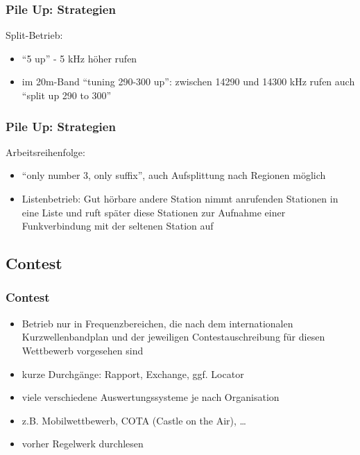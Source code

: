 \begin{frame}
    \frametitle{Pile Up: Strategien}

    Split-Betrieb:

    \begin{itemize}
        \item ``5 up'' - 5 kHz höher rufen
        \item im 20m-Band ``tuning 290-300 up'': zwischen 14290 und 14300 kHz rufen
              auch ``split up 290 to 300''
    \end{itemize}

\end{frame}

\begin{frame}
    \frametitle{Pile Up: Strategien}

    Arbeitsreihenfolge:

    \begin{itemize}
        \item ``only number 3, only suffix'', auch Aufsplittung nach Regionen möglich
        \item Listenbetrieb: Gut hörbare andere Station nimmt anrufenden
        Stationen in eine Liste und ruft später diese Stationen zur Aufnahme
        einer Funkverbindung mit der seltenen Station auf
    \end{itemize}

\end{frame}

\subsection{Contest}

\begin{frame}
    \frametitle{Contest}


    \begin{itemize}
        \item Betrieb nur in Frequenzbereichen, die nach dem internationalen
          Kurzwellenbandplan und der jeweiligen Contestauschreibung für diesen
          Wettbewerb vorgesehen sind
        \item kurze Durchgänge: Rapport, Exchange, ggf. Locator
        \item viele verschiedene Auswertungssysteme je nach Organisation
        \item z.B. Mobilwettbewerb, COTA (Castle on the Air), \dots
        \item vorher Regelwerk durchlesen
    \end{itemize}

\end{frame}

